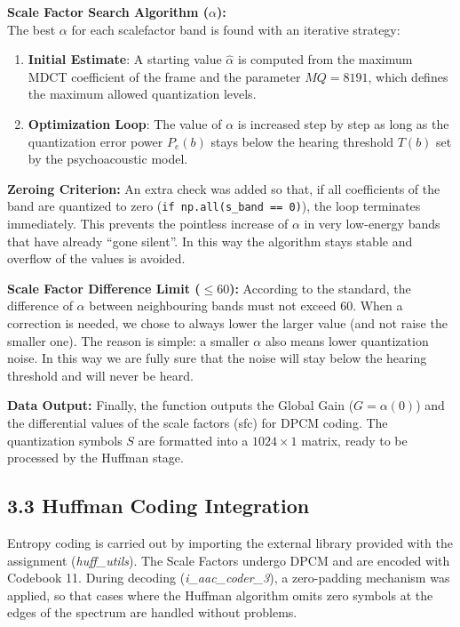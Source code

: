 \documentclass[11pt,twocolumn]{article}
\newcommand{\fn}[1]{\textit{#1}}
\newcommand{\sub}[1]{\subsection*{#1}}
\begin{document}
\textbf{Scale Factor Search Algorithm ($\alpha$):}\\
The best $\alpha$ for each scalefactor band is found with an iterative strategy:
\begin{enumerate}
  \item \textbf{Initial Estimate}: A starting value $\hat{\alpha}$ is computed from the maximum MDCT coefficient of the frame and the parameter $MQ=8191$, which defines the maximum allowed quantization levels.
  \item \textbf{Optimization Loop}: The value of $\alpha$ is increased step by step as long as the quantization error power $P_e(b)$ stays below the hearing threshold $T(b)$ set by the psychoacoustic model.
\end{enumerate}

\textbf{Zeroing Criterion:} An extra check was added so that, if all coefficients of the band are quantized to zero (\texttt{if np.all(s\_band == 0)}), the loop terminates immediately. This prevents the pointless increase of $\alpha$ in very low-energy bands that have already ``gone silent''. In this way the algorithm stays stable and overflow of the values is avoided.

\textbf{Scale Factor Difference Limit ($\leq 60$):} According to the standard, the difference of $\alpha$ between neighbouring bands must not exceed 60. When a correction is needed, we chose to always lower the larger value (and not raise the smaller one). The reason is simple: a smaller $\alpha$ also means lower quantization noise. In this way we are fully sure that the noise will stay below the hearing threshold and will never be heard.

\textbf{Data Output:} Finally, the function outputs the Global Gain ($G=\alpha(0)$) and the differential values of the scale factors (sfc) for DPCM coding. The quantization symbols $S$ are formatted into a $1024\times1$ matrix, ready to be processed by the Huffman stage.

\sub{3.3 Huffman Coding Integration}
Entropy coding is carried out by importing the external library provided with the assignment (\fn{huff\_utils}). The Scale Factors undergo DPCM and are encoded with Codebook 11. During decoding (\fn{i\_aac\_coder\_3}), a zero-padding mechanism was applied, so that cases where the Huffman algorithm omits zero symbols at the edges of the spectrum are handled without problems.
\end{document}
